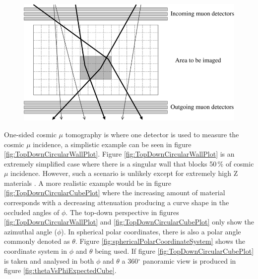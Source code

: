 \begin{figure}[htbp]
 \centering
 \includegraphics[width=0.8\linewidth]{Chapter5/Figs/Raster/twoSidedCosmicMuon_schults2007.png}
 \label{fig:twoSidedCosmicMuonTomographySchults}
\end{figure}
 
 One-sided cosmic $\mu$ tomography is where one detector is used to measure the cosmic $\mu$ incidence, a simplistic example can be seen in figure \ref{fig:TopDownCircularWallPlot}. Figure \ref{fig:TopDownCircularWallPlot} is an extremely simplified case where there is a singular wall that blocks 50\,\% of cosmic $\mu$ incidence. However, such a scenario is unlikely except for extremely high Z materials \cite{schultz_2007}. A more realistic example would be in figure \ref{fig:TopDownCircularCubePlot} where the increasing amount of material corresponds with a decreasing attenuation producing a curve shape in the occluded angles of $\phi$. The top-down perspective in figures \ref{fig:TopDownCircularWallPlot} and \ref{fig:TopDownCircularCubePlot} only show the azimuthal angle ($\phi$). In spherical polar coordinates, there is also a polar angle commonly denoted as $\theta$. Figure \ref{fig:sphericalPolarCoordinateSystem} shows the coordinate system in $\phi$ and $\theta$ being used. If figure \ref{fig:TopDownCircularCubePlot} is taken and analysed in both $\phi$ and $\theta$ a 360$^\circ$ panoramic view is produced in figure \ref{fig:thetaVsPhiExpectedCube}.
 
